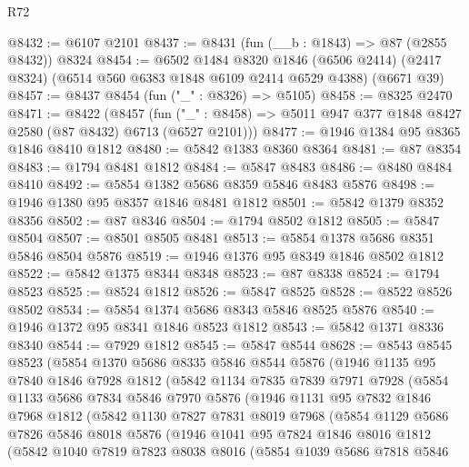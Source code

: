 \begin{lexlean}{R72}
\begin{coremodule}
@8432 := @6107 @2101
@8437 := @8431 (fun (__b : @1843) => @87 (@2855 @8432)) @8324
@8454 := @6502
    @1484
    @8320
    @1846
    (@6506 @2414)
    (@2417 @8324)
    (@6514 @560 @6383 @1848 @6109 @2414 @6529 @4388)
    (@6671 @39)
@8457 := @8437 @8454 (fun ("_" : @8326) => @5105)
@8458 := @8325 @2470
@8471 := @8422
    (@8457 (fun ("_" : @8458) => @5011 @947 @377 @1848 @8427 @2580 (@87 @8432) @6713 (@6527 @2101)))
@8477 := @1946 @1384 @95 @8365 @1846 @8410 @1812
@8480 := @5842 @1383 @8360 @8364
@8481 := @87 @8354
@8483 := @1794 @8481 @1812
@8484 := @5847 @8483
@8486 := @8480 @8484 @8410
@8492 := @5854 @1382 @5686 @8359 @5846 @8483 @5876
@8498 := @1946 @1380 @95 @8357 @1846 @8481 @1812
@8501 := @5842 @1379 @8352 @8356
@8502 := @87 @8346
@8504 := @1794 @8502 @1812
@8505 := @5847 @8504
@8507 := @8501 @8505 @8481
@8513 := @5854 @1378 @5686 @8351 @5846 @8504 @5876
@8519 := @1946 @1376 @95 @8349 @1846 @8502 @1812
@8522 := @5842 @1375 @8344 @8348
@8523 := @87 @8338
@8524 := @1794 @8523
@8525 := @8524 @1812
@8526 := @5847 @8525
@8528 := @8522 @8526 @8502
@8534 := @5854 @1374 @5686 @8343 @5846 @8525 @5876
@8540 := @1946 @1372 @95 @8341 @1846 @8523 @1812
@8543 := @5842 @1371 @8336 @8340
@8544 := @7929 @1812
@8545 := @5847 @8544
@8628 := @8543
    @8545
    @8523
    (@5854
      @1370
      @5686
      @8335
      @5846
      @8544
      @5876
      (@1946
        @1135
        @95
        @7840
        @1846
        @7928
        @1812
        (@5842
          @1134
          @7835
          @7839
          @7971
          @7928
          (@5854
            @1133
            @5686
            @7834
            @5846
            @7970
            @5876
            (@1946
              @1131
              @95
              @7832
              @1846
              @7968
              @1812
              (@5842
                @1130
                @7827
                @7831
                @8019
                @7968
                (@5854
                  @1129
                  @5686
                  @7826
                  @5846
                  @8018
                  @5876
                  (@1946
                    @1041
                    @95
                    @7824
                    @1846
                    @8016
                    @1812
                    (@5842
                      @1040
                      @7819
                      @7823
                      @8038
                      @8016
                      (@5854
                        @1039
                        @5686
                        @7818
                        @5846

\end{coremodule}
\end{lexlean}
